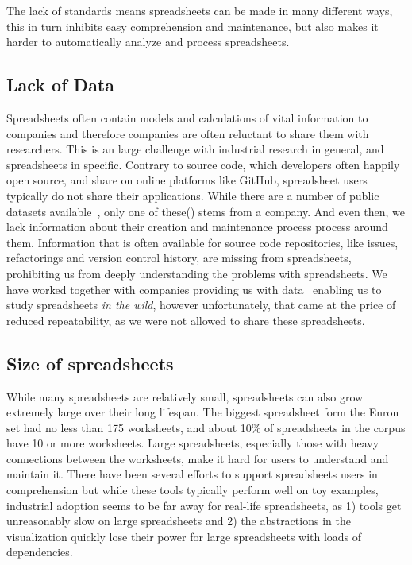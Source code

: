 \documentclass[conference]{IEEEtran}
\begin{document}
The lack of standards means spreadsheets can be made in many different ways, this in turn inhibits easy comprehension and maintenance, but also makes it harder to automatically analyze and process spreadsheets.

\subsection{Lack of Data}
Spreadsheets often contain models and calculations of vital information to companies and therefore companies are often reluctant to share them with researchers. This is an large challenge with industrial research in general, and spreadsheets in specific. Contrary to source code, which developers often happily open source, and share on online platforms like GitHub, spreadsheet users typically do not share their applications. While there are a number of public datasets available~\cite{fisher_euses_2005, Hermans2015, conf/msr/BarikLSSM15}, only one of these(\cite{Hermans2015}) stems from a company. And even then, we lack information about their creation and maintenance process process around them. Information that is often available for source code repositories, like issues, refactorings and version control history, are missing from spreadsheets, prohibiting us from deeply understanding the problems with spreadsheets. We have worked together with companies providing us with data~\cite{hermans_supporting_2011, hermans_detecting_2012, hermans_detecting_2012-1, hermans_detecting_2014, Jansen2015} enabling us to study spreadsheets \emph{in the wild}, however unfortunately, that came at the price of reduced repeatability, as we were not allowed to share these spreadsheets.

\subsection{Size of spreadsheets}
While many spreadsheets are relatively small, spreadsheets can also grow extremely large over their long lifespan. The biggest spreadsheet form the Enron set had no less than 175 worksheets, and about 10\% of spreadsheets in the corpus have 10 or more worksheets. Large spreadsheets, especially those with heavy connections between the worksheets, make it hard for users to  understand and maintain it. There have been several efforts to support spreadsheets users in comprehension  but while these tools typically perform well on toy examples, industrial adoption seems to be far away for real-life spreadsheets, as 1) tools get unreasonably slow on large spreadsheets and 2) the abstractions in the visualization quickly lose their power for large spreadsheets with loads of dependencies. 
\end{document}
